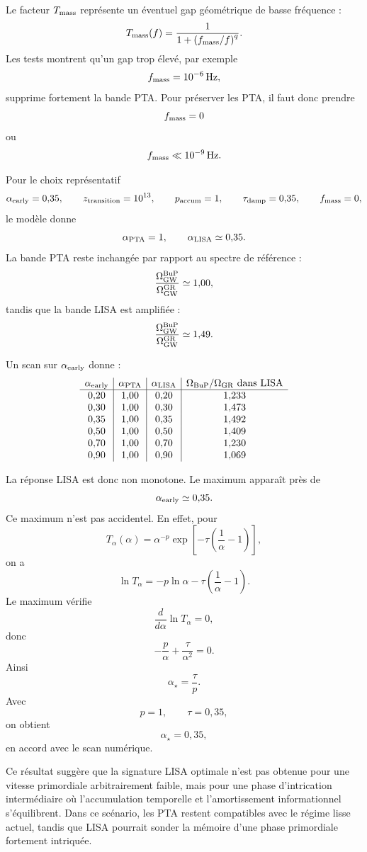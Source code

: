 \documentclass[11pt,a4paper]{article}
\begin{document}
Le facteur \(T_{\rm mass}\) représente un éventuel gap géométrique de basse
fréquence :
\[
T_{\rm mass}(f)
=
\frac{1}{1+\left(f_{\rm mass}/f\right)^q}.
\]
Les tests montrent qu'un gap trop élevé, par exemple
\[
f_{\rm mass}=10^{-6}\,{\rm Hz},
\]
supprime fortement la bande PTA. Pour préserver les PTA, il faut donc prendre
\[
f_{\rm mass}=0
\]
ou
\[
f_{\rm mass}\ll10^{-9}\,{\rm Hz}.
\]

Pour le choix représentatif
\[
\alpha_{\rm early}=0{,}35,
\qquad
z_{\rm transition}=10^{13},
\qquad
p_{\rm accum}=1,
\qquad
\tau_{\rm damp}=0{,}35,
\qquad
f_{\rm mass}=0,
\]
le modèle donne
\[
\alpha_{\rm PTA}=1,
\qquad
\alpha_{\rm LISA}\simeq0{,}35.
\]
La bande PTA reste inchangée par rapport au spectre de référence :
\[
\frac{\Omega_{\rm GW}^{\rm BuP}}
{\Omega_{\rm GW}^{\rm GR}}
\simeq
1{,}00,
\]
tandis que la bande LISA est amplifiée :
\[
\frac{\Omega_{\rm GW}^{\rm BuP}}
{\Omega_{\rm GW}^{\rm GR}}
\simeq
1{,}49.
\]

Un scan sur \(\alpha_{\rm early}\) donne :
\[
\begin{array}{c|c|c|c}
\alpha_{\rm early}
&
\alpha_{\rm PTA}
&
\alpha_{\rm LISA}
&
\Omega_{\rm BuP}/\Omega_{\rm GR}\ {\rm dans\ LISA}
\\
\hline
0{,}20 & 1{,}00 & 0{,}20 & 1{,}233 \\
0{,}30 & 1{,}00 & 0{,}30 & 1{,}473 \\
0{,}35 & 1{,}00 & 0{,}35 & 1{,}492 \\
0{,}50 & 1{,}00 & 0{,}50 & 1{,}409 \\
0{,}70 & 1{,}00 & 0{,}70 & 1{,}230 \\
0{,}90 & 1{,}00 & 0{,}90 & 1{,}069 \\
\end{array}
\]

La réponse LISA est donc non monotone. Le maximum apparaît près de
\[
\alpha_{\rm early}\simeq0{,}35.
\]
Ce maximum n'est pas accidentel. En effet, pour
\[
T_\alpha(\alpha)
=
\alpha^{-p}
\exp\left[
-\tau
\left(
\frac{1}{\alpha}-1
\right)
\right],
\]
on a
\[
\ln T_\alpha
=
-p\ln\alpha
-
\tau
\left(
\frac{1}{\alpha}-1
\right).
\]
Le maximum vérifie
\[
\frac{d}{d\alpha}\ln T_\alpha=0,
\]
donc
\[
-\frac{p}{\alpha}
+
\frac{\tau}{\alpha^2}
=
0.
\]
Ainsi
\[
\alpha_\star=\frac{\tau}{p}.
\]
Avec
\[
p=1,
\qquad
\tau=0{,}35,
\]
on obtient
\[
\alpha_\star=0{,}35,
\]
en accord avec le scan numérique.

Ce résultat suggère que la signature LISA optimale n'est pas obtenue pour une
vitesse primordiale arbitrairement faible, mais pour une phase d'intrication
intermédiaire où l'accumulation temporelle et l'amortissement informationnel
s'équilibrent. Dans ce scénario, les PTA restent compatibles avec le régime
lisse actuel, tandis que LISA pourrait sonder la mémoire d'une phase primordiale
fortement intriquée.
\end{document}
